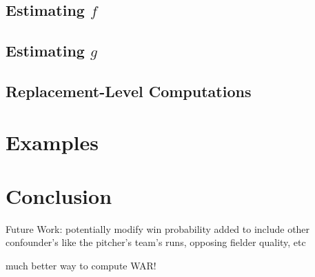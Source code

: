 \documentclass[12pt]{article}
\begin{document}
\subsection{Estimating $f$}


\subsection{Estimating $g$}


\subsection{Replacement-Level Computations}



%
%



\section{Examples}



\section{Conclusion}

Future Work: potentially modify win probability added to include other confounder's like the pitcher's team's runs, opposing fielder quality, etc

much better way to compute WAR!
\end{document}
